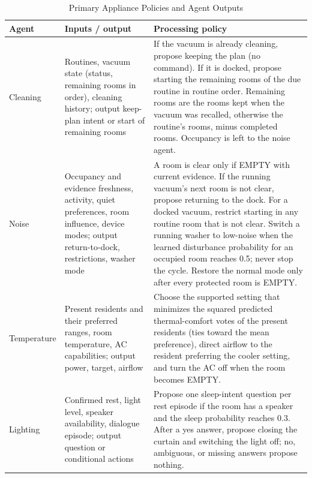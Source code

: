 \documentclass[conference]{IEEEtran}
\begin{document}
\begin{table}[!t]
\caption{Primary Appliance Policies and Agent Outputs}
\label{tab:policies}
\centering
\small
\begin{tabularx}{\textwidth}{
@{}L{0.11\textwidth}L{0.24\textwidth}Y@{}
}
\toprule
\textbf{Agent} & \textbf{Inputs / output}
& \textbf{Processing policy} \\
\midrule
Cleaning
& Routines, vacuum state (status, remaining rooms in order),
cleaning history; output keep-plan intent or start of remaining rooms
& If the vacuum is already cleaning, propose keeping the plan (no
command). If it is docked, propose starting the remaining rooms of
the due routine in routine order. Remaining rooms are the rooms kept
when the vacuum was recalled, otherwise the routine's rooms, minus
completed rooms. Occupancy is left to the noise agent. \\

Noise
& Occupancy and evidence freshness, activity, quiet preferences,
room influence, device modes; output return-to-dock, restrictions,
washer mode
& A room is clear only if EMPTY with current evidence. If the
running vacuum's next room is not clear, propose returning to the
dock. For a docked vacuum, restrict starting in any routine room
that is not clear. Switch a running washer to low-noise when the
learned disturbance probability for an occupied room reaches 0.5;
never stop the cycle. Restore the normal mode only after every
protected room is EMPTY. \\

Temperature
& Present residents and their preferred ranges, room temperature,
AC capabilities; output power, target, airflow
& Choose the supported setting that minimizes the squared predicted
thermal-comfort votes of the present residents (ties toward the mean
preference), direct airflow to the resident preferring the cooler
setting, and turn the AC off when the room becomes EMPTY. \\

Lighting
& Confirmed rest, light level, speaker availability, dialogue
episode; output question or conditional actions
& Propose one sleep-intent question per rest episode if the room
has a speaker and the sleep probability reaches 0.3. After a yes
answer, propose closing the curtain and switching the light off;
no, ambiguous, or missing answers propose nothing. \\
\bottomrule
\end{tabularx}
\end{table}
\end{document}
